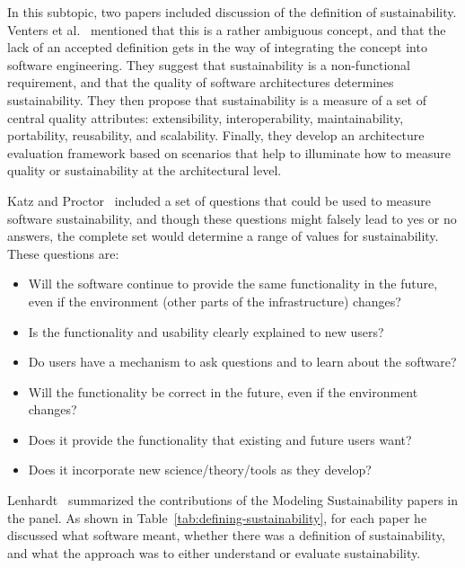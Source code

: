 \documentclass[11pt, oneside]{amsart}
\begin{document}
In this subtopic, two papers included discussion of the definition of
sustainability.  Venters et al.~\cite{Venters_WSSSPE} mentioned that this is a
rather ambiguous concept, and that the lack of an accepted definition gets in
the way of integrating the concept into software engineering. They suggest that
sustainability is a non-functional requirement, and that the quality of
software architectures determines sustainability.  They then propose that
sustainability is a measure of a set of central quality attributes:
extensibility, interoperability, maintainability, portability, reusability, and
scalability. Finally, they develop an architecture evaluation framework based
on scenarios that help to illuminate how to measure quality or sustainability
at the architectural level.

Katz and Proctor~\cite{Katz_WSSSPE} included a set of questions that could be
used to measure software sustainability, and though these questions might
falsely lead to yes or no answers, the complete set would determine a range of
values for sustainability. These questions are:
\begin{itemize}
\item Will the software continue to provide the same functionality in the future,
      even if the environment (other parts of the infrastructure) changes?
\item Is the functionality and usability clearly explained to new users?
\item Do users have a mechanism to ask questions and to learn about the software?
\item Will the functionality be correct in the future, even if the environment changes?
\item Does it provide the functionality that existing and future users want?
\item Does it incorporate new science/theory/tools as they develop?
\end{itemize}

Lenhardt~\cite{lenhardt-wssspe1-panel} summarized the contributions of the
Modeling Sustainability papers in the panel. As shown in
Table~\ref{tab:defining-sustainability}, for each paper he discussed what
software meant, whether there was a definition of sustainability, and what the
approach was to either understand or evaluate sustainability.
\end{document}
